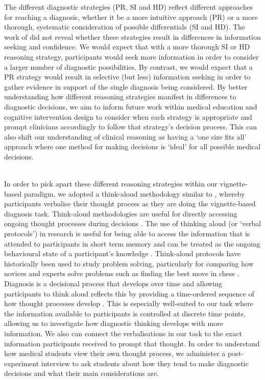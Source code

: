 \documentclass[a4paper, nobind]{templates/ociamthesis}
\begin{document}
\hfill\break
The different diagnostic strategies (PR, SI and HD) reflect different approaches for reaching a diagnosis, whether it be a more intuitive approach (PR) or a more thorough, systematic consideration of possible differentials (SI and HD). The work of \textcite{coderre_diagnostic_2003} did not reveal whether these strategies result in differences in information seeking and confidence. We would expect that with a more thorough SI or HD reasoning strategy, participants would seek more information in order to consider a larger number of diagnostic possibilities. By contrast, we would expect that a PR strategy would result in selective (but less) information seeking in order to gather evidence in support of the single diagnosis being considered. By better understanding how different reasoning strategies manifest in differences to diagnostic decisions, we aim to inform future work within medical education and cognitive intervention design to consider when each strategy is appropriate and prompt clinicians accordingly to follow that strategy's decision process. This can also shift our understanding of clinical reasoning as having a `one size fits all' approach where one method for making decisions is `ideal' for all possible medical decisions.\\
\strut \\

In order to pick apart these different reasoning strategies within our vignette-based paradigm, we adopted a think-aloud methodology similar to \textcite{coderre_diagnostic_2003}, whereby participants verbalise their thought process as they are doing the vignette-based diagnosis task. Think-aloud methodologies are useful for directly accessing ongoing thought processes during decisions \autocite{someren_think_1994}. The use of thinking aloud (or `verbal protocols') in research is useful for being able to access the information that is attended to participants in short term memory \autocite{payne_thinking_1994} and can be treated as the ongoing behavioural state of a participant's knowledge \autocite{newell_human_1972}. Think-aloud protocols have historically been used to study problem solving, particularly for comparing how novices and experts solve problems such as finding the best move in chess \autocite{groot_thought_1978}. Diagnosis is a decisional process that develops over time and allowing participants to think aloud reflects this by providing a time-ordered sequence of how thought processes develop \autocite{payne_thinking_1994}. This is especially well-suited to our task where the information available to participants is controlled at discrete time points, allowing us to investigate how diagnostic thinking develops with more information. We also can connect the verbalisations in our task to the exact information participants received to prompt that thought. In order to understand how medical students view their own thought process, we administer a post-experiment interview to ask students about how they tend to make diagnostic decisions and what their main considerations are.\\
\end{document}
